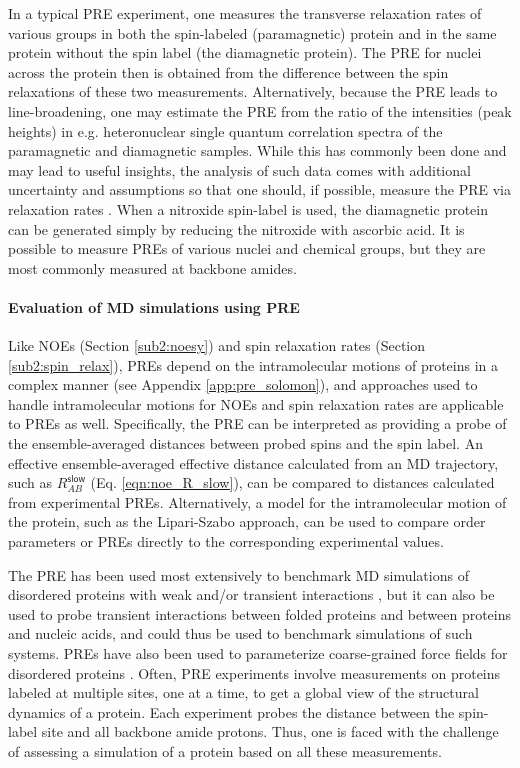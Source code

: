 \documentclass[9pt,review]{livecoms}
\begin{document}
In a typical PRE experiment, one measures the transverse relaxation rates of various groups in both the spin-labeled (paramagnetic) protein and in the same protein without the spin label (the diamagnetic protein).
The PRE for nuclei across the protein then is obtained from the difference between the spin relaxations of these two measurements.
Alternatively, because the PRE leads to line-broadening, one may estimate the PRE from the ratio of the intensities (peak heights) in e.g. heteronuclear single quantum correlation spectra of the paramagnetic and diamagnetic samples.
While this has commonly been done and may lead to useful insights, the analysis of such data comes with additional uncertainty and assumptions so that one should, if possible, measure the PRE via relaxation rates \cite{clore2009theory}.
When a nitroxide spin-label is used, the diamagnetic protein can be generated simply by reducing the nitroxide with ascorbic acid.
It is possible to measure PREs of various nuclei and chemical groups, but they are most commonly measured at backbone amides.

\paragraph{Evaluation of MD simulations using PRE}

Like NOEs (Section \ref{sub2:noesy}) and spin relaxation rates (Section \ref{sub2:spin_relax}), PREs depend on the intramolecular motions of proteins in a complex manner (see Appendix \ref{app:pre_solomon}), and approaches used to handle intramolecular motions for NOEs and spin relaxation rates are applicable to PREs as well.
Specifically, the PRE can be interpreted as providing a probe of the ensemble-averaged distances between probed spins and the spin label.
An effective ensemble-averaged effective distance calculated from an MD trajectory, such as $R_{AB}^{\mathsf{slow}}$ (Eq. \ref{eqn:noe_R_slow}), can be compared to distances calculated from experimental PREs.
Alternatively, a model for the intramolecular motion of the protein, such as the Lipari-Szabo approach, can be used to compare order parameters or PREs directly to the corresponding experimental values.

The PRE has been used most extensively to benchmark MD simulations of disordered proteins with weak and/or transient interactions \cite{piana_water_2015,robustelli_developing_2018}, but it can also be used to probe transient interactions between folded proteins and between proteins and nucleic acids, and could thus be used to benchmark simulations of such systems. PREs have also been used to parameterize coarse-grained force fields for disordered proteins \cite{norgaard2008experimental,tesei2021accurate}.
Often, PRE experiments involve measurements on proteins labeled at multiple sites, one at a time, to get a global view of the structural dynamics of a protein.
Each experiment probes the distance between the spin-label site and all backbone amide protons.
Thus, one is faced with the challenge of assessing a simulation of a protein based on all these measurements.
\end{document}
